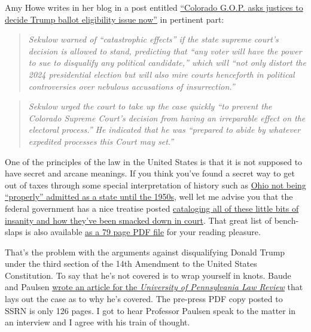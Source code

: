 Amy Howe writes in her blog in a post entitled
\href{https://amylhowe.com/2023/12/28/colorado-g-o-p-asks-justices-to-decide-trump-ballot-eligibility-issue-now/}{``Colorado
G.O.P. asks justices to decide Trump ballot eligibility issue now''} in
pertinent part:

\begin{quote}
\emph{Sekulow warned of ``catastrophic effects'' if the state supreme
court's decision is allowed to stand, predicting that ``any voter will
have the power to sue to disqualify any political candidate,'' which
will ``not only distort the 2024 presidential election but will also
mire courts henceforth in political controversies over nebulous
accusations of insurrection.''}
\end{quote}

\begin{quote}
\emph{Sekulow urged the court to take up the case quickly ``to prevent
the Colorado Supreme Court's decision from having an irreparable effect
on the electoral process.'' He indicated that he was ``prepared to abide
by whatever expedited processes this Court may set.''}
\end{quote}

One of the principles of the law in the United States is that it is not
supposed to have secret and arcane meanings. If you think you've found a
secret way to get out of taxes through some special interpretation of
history such as
\href{https://web.archive.org/web/20231228043521/https://history.house.gov/Historical-Highlights/1951-2000/The-admission-of-Ohio-as-a-state/}{Ohio
not being ``properly'' admitted as a state until the 1950s}, well let me
advise you that the federal government has a nice treatise posted
\href{https://www.irs.gov/privacy-disclosure/the-truth-about-frivolous-tax-arguments-introduction}{cataloging
all of these little bits of insanity and how they've been smacked down
in court}. That great list of bench-slaps is also available
\href{https://www.irs.gov/pub/irs-utl/2022-the-truth-about-frivolous-tax-arguments.pdf}{as
a 79 page PDF file} for your reading pleasure.

That's the problem with the arguments against disqualifying Donald Trump
under the third section of the 14th Amendment to the United States
Constitution. To say that he's not covered is to wrap yourself in knots.
Baude and Paulsen
\href{https://papers.ssrn.com/sol3/papers.cfm?abstract_id=4532751}{wrote
an article for the \emph{University of Pennsylvania Law Review}} that
lays out the case as to why he's covered. The pre-press PDF copy posted
to SSRN is only 126 pages. I got to hear Professor Paulsen speak to the
matter in an interview and I agree with his train of thought.

